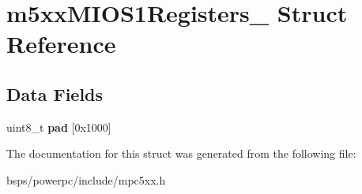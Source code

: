 \hypertarget{structm5xxMIOS1Registers__}{}\section{m5xx\+M\+I\+O\+S1\+Registers\+\_\+ Struct Reference}
\label{structm5xxMIOS1Registers__}
\subsection*{Data Fields}
\begin{DoxyCompactItemize}
\item 
\mbox{\label{structm5xxMIOS1Registers___aef9942434f02179d115c2318aa50d716}} 
uint8\+\_\+t {\bfseries pad} \mbox{[}0x1000\mbox{]}
\end{DoxyCompactItemize}


The documentation for this struct was generated from the following file\+:\begin{DoxyCompactItemize}
\item 
bsps/powerpc/include/mpc5xx.\+h\end{DoxyCompactItemize}
